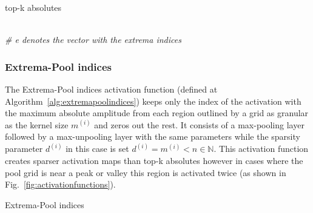 \documentclass[journal]{IEEEtran}
\begin{document}
\begin{algorithm}[H]
  \caption{top-k absolutes}\label{alg:topkabsolutes}
  \begin{algorithmic}[1]
    \renewcommand{\algorithmicrequire}{\textbf{Input:}}
    \renewcommand{\algorithmicensure}{\textbf{Output:}}
    \ENSURE{$\alpha$}
    \\\textit{\scriptsize \# e denotes the vector with the extrema indices}
    \ENDFOR{}
    \RETURN{$\alpha$}
  \end{algorithmic}
\end{algorithm}

\subsubsection{Extrema-Pool indices}\label{sec:extremapoolindices}
The Extrema-Pool indices activation function (defined at Algorithm~\ref{alg:extremapoolindices}) keeps only the index of the activation with the maximum absolute amplitude from each region outlined by a grid as granular as the kernel size $m^{(i)}$ and zeros out the rest.
It consists of a max-pooling layer followed by a max-unpooling layer with the same parameters while the sparsity parameter $d^{(i)}$ in this case is set $d^{(i)} = m^{(i)} < n \in \mathbb{N}$.
This activation function creates sparser activation maps than top-k absolutes however in cases where the pool grid is near a peak or valley this region is activated twice (as shown in Fig.~\ref{fig:activationfunctions}).

\begin{algorithm}[H]
  \caption{Extrema-Pool indices}\label{alg:extremapoolindices}
  \begin{algorithmic}[1]
    \renewcommand{\algorithmicrequire}{\textbf{Input:}}
    \renewcommand{\algorithmicensure}{\textbf{Output:}}
    \ENSURE{$\alpha$}
    \RETURN{$\alpha$}
  \end{algorithmic}
\end{algorithm}
\end{document}
